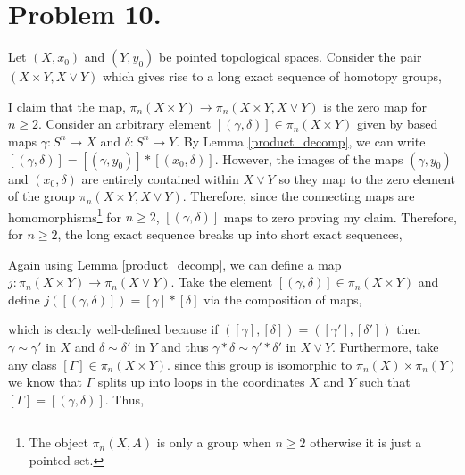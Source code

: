 \documentclass[12pt]{extarticle}
\begin{document}
\newpage

\section*{Problem 10.}

Let $(X, x_0)$ and $(Y, y_0)$ be pointed topological spaces. Consider the pair $(X \times Y, X \vee Y)$ which gives rise to a long exact sequence of homotopy groups,
\begin{center}
\end{center}
I claim that the map, $\pi_{n}(X \times Y) \to \pi_{n}(X \times Y, X \vee Y)$ is the zero map for $n \ge 2$. Consider an arbitrary element $[(\gamma, \delta)] \in \pi_n(X \times Y)$ given by based maps $\gamma : S^n \to X$ and $\delta: S^n \to Y$. By Lemma \ref{product_decomp}, we can write $[(\gamma, \delta)] = [(\gamma, y_0)] * [(x_0, \delta)]$. However, the images of the maps $(\gamma, y_0)$ and $(x_0, \delta)$ are entirely contained within $X \vee Y$ so they map to the zero element of the group $\pi_{n}(X \times Y, X \vee Y)$. Therefore, since the connecting maps are homomorphisms\footnote{The object $\pi_n(X, A)$ is only a group when $n \ge 2$ otherwise it is just a pointed set.} for $n \ge 2$, $[(\gamma, \delta)]$ maps to zero proving my claim. Therefore, for $n \ge 2$, the long exact sequence breaks up into short exact sequences,
\begin{center}
\end{center}
Again using Lemma \ref{product_decomp}, we can define a map $j : \pi_n(X \times Y) \to \pi_n(X \vee Y)$. Take the element $[(\gamma, \delta)] \in \pi_n(X \times Y)$ and define $j([(\gamma, \delta)]) = [\gamma] * [\delta]$ via the composition of maps,
\begin{center}
\end{center}
which is clearly well-defined because if $([\gamma], [\delta]) = ([\gamma'], [\delta'])$ then $\gamma \sim \gamma'$ in $X$ and $\delta \sim \delta'$ in $Y$ and thus $\gamma * \delta \sim \gamma' * \delta'$ in $X \vee Y$. Furthermore, take any class $[\Gamma ] \in \pi_n(X \times Y)$. since this group is isomorphic to $\pi_n(X) \times \pi_n(Y)$ we know that $\Gamma$ splits up into loops in the coordinates $X$ and $Y$ such that $[\Gamma] = [(\gamma, \delta)]$. Thus,
\end{document}
